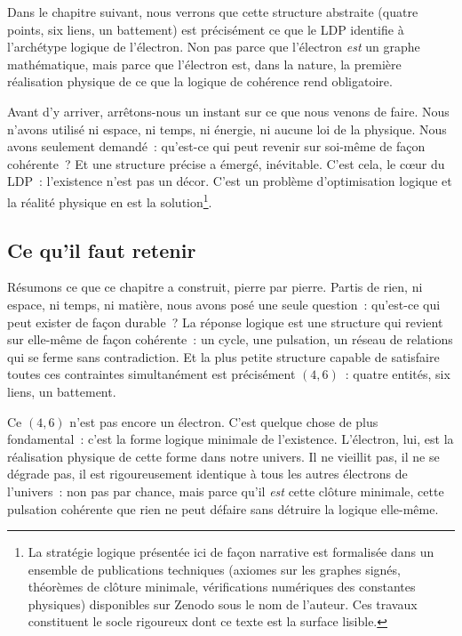 \documentclass[12pt, a4paper, openright]{book}
\begin{document}
Dans le chapitre suivant, nous verrons que cette structure abstraite (quatre points, six liens, un battement) est précisément ce que le LDP identifie à l'archétype logique de l'électron. Non pas parce que l'électron \emph{est} un graphe mathématique, mais parce que l'électron est, dans la nature, la première réalisation physique de ce que la logique de cohérence rend obligatoire.

\medskip

Avant d'y arriver, arrêtons-nous un instant sur ce que nous venons de faire. Nous n'avons utilisé ni espace, ni temps, ni énergie, ni aucune loi de la physique. Nous avons seulement demandé~: qu'est-ce qui peut revenir sur soi-même de façon cohérente~? Et une structure précise a émergé, inévitable. C'est cela, le c\oe{}ur du LDP~: l'existence n'est pas un décor. C'est un problème d'optimisation logique et la réalité physique en est la solution\footnote{La stratégie logique présentée ici de façon narrative est formalisée dans un ensemble de publications techniques (axiomes sur les graphes signés, théorèmes de clôture minimale, vérifications numériques des constantes physiques) disponibles sur Zenodo sous le nom de l'auteur. Ces travaux constituent le socle rigoureux dont ce texte est la surface lisible.}. 

\subsection*{Ce qu'il faut retenir}

Résumons ce que ce chapitre a construit, pierre par pierre. Partis de rien, ni espace, ni temps, ni matière, nous avons posé une seule question~: qu'est-ce qui peut exister de façon durable~? La réponse logique est une structure qui revient sur elle-même de façon cohérente~: un cycle, une pulsation, un réseau de relations qui se ferme sans contradiction. Et la plus petite structure capable de satisfaire toutes ces contraintes simultanément est précisément $(4,6)$~: quatre entités, six liens, un battement.

\medskip

Ce $(4,6)$ n'est pas encore un électron. C'est quelque chose de plus fondamental~: c'est la forme logique minimale de l'existence. L'électron, lui, est la réalisation physique de cette forme dans notre univers. Il ne vieillit pas, il ne se dégrade pas, il est rigoureusement identique à tous les autres électrons de l'univers~: non pas par chance, mais parce qu'il \emph{est} cette clôture minimale, cette pulsation cohérente que rien ne peut défaire sans détruire la logique elle-même.
\end{document}
